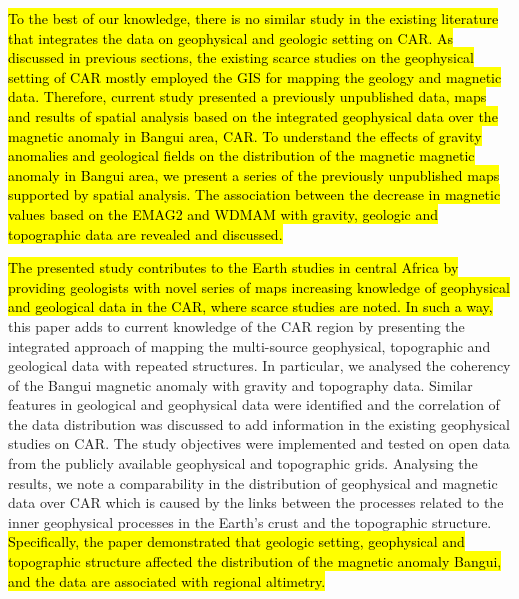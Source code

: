 \documentclass[minerals,article,submit,pdftex,moreauthors]{Definitions/mdpi}
\begin{document}
\hl{To the best of our knowledge, there is no similar study in the existing literature that integrates the data on geophysical and geologic setting on CAR. As discussed in previous sections, the existing scarce studies on the geophysical setting of CAR mostly employed the GIS for mapping the geology and magnetic data. Therefore, current study presented a previously unpublished data, maps and results of spatial analysis based on the integrated geophysical data over the magnetic anomaly in Bangui area, CAR. To understand the effects of gravity anomalies and geological fields on the distribution of the magnetic magnetic anomaly in Bangui area, we present a series of the previously unpublished maps supported by spatial analysis. The association between the decrease in magnetic values based on the EMAG2 and WDMAM with gravity, geologic and topographic data are revealed and discussed.}

\hl{The presented study contributes to the Earth studies in central Africa by providing geologists with novel series of maps increasing knowledge of geophysical and geological data in the CAR, where scarce studies are noted. In such a way, }this paper adds to current knowledge of the CAR region by presenting the integrated approach of mapping the multi-source geophysical, topographic and geological data with repeated structures. In particular, we analysed the coherency of the Bangui magnetic anomaly with gravity and topography data. Similar features in geological and geophysical data were identified and the correlation of the data distribution was discussed to add information in the existing geophysical studies on CAR. The study objectives were implemented and tested on open data from the publicly available geophysical and topographic grids. Analysing the results, we note a comparability in the distribution of geophysical and magnetic data over CAR which is caused by the links between the processes related to the inner geophysical processes in the Earth's crust and the topographic structure. \hl{Specifically, the paper demonstrated that geologic setting, geophysical and topographic structure affected the distribution of the magnetic anomaly Bangui, and the data are associated with regional altimetry.}
\end{document}
